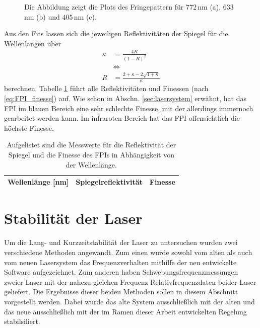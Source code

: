 \begin{figure}[hp]
	\caption[Finesse des FPIs]{Die Abbildung zeigt die Plots des
 	Fringepattern für $772\,$nm (a), $633\,$nm (b) und $405\,$nm (c).}
	\label{fig:finesse_messung}
 	\centering
 	\footnotesize
 	\fbox{\parbox{\dimexpr \linewidth - 2\fboxrule - 2\fboxsep}{
 	\subfloat[]{
		\label{subfig:finesse_messung_a}
		
		}\\
 	\subfloat[]{
		\label{subfig:finesse_messung_b}
		
		}\\
	 \subfloat[]{
		\label{subfig:finesse_messung_c}
		
		}
	}}
\end{figure}
Aus den Fits lassen sich die jeweiligen Reflektivitäten der Spiegel für die
Wellenlängen über
\begin{equation}\label{eq:finesse_messung_02}
	\begin{split}
		\kappa&=\frac{4R}{(1-R)^2}\\
		&\Leftrightarrow\\
		R&=\frac{2+\kappa-2\sqrt{1+\kappa}}{\kappa}
	\end{split}	
\end{equation}
berechnen. Tabelle \ref{tab:finesse} führt alle Reflektivitäten und Finessen
(nach \ref{eq:FPI_finesse}) auf. Wie schon in Abschn. \ref{sec:lasersystem}
erwähnt, hat das FPI im blauen Bereich eine sehr schlechte Finesse, mit der
allerdings immernoch gearbeitet werden kann. Im infraroten Bereich hat das FPI
offensichtlich die höchste Finesse.
\begin{table}[h]
	\begin{tabular}{ccc}
		\toprule
		\multicolumn{1}{C{0.30\textwidth}}{Wellenlänge [nm]} &
		\multicolumn{1}{C{0.31\textwidth}}{Spiegelreflektivität} &
		\multicolumn{1}{C{0.30\textwidth}}{Finesse}\\
		\midrule[1px]
		\hline
		
		\bottomrule[1px]
	\end{tabular}
	\caption[FPI Finesse]{Aufgelistet sind die Messwerte für die Reflektivität der
	Spiegel und die Finesse des FPIs in Abhängigkeit von der Wellenlänge.}
	\label{tab:finesse}
\end{table}

\section{Stabilität der Laser}\label{sec:stabilitaet_der_laser}
Um die Lang- und Kurzzeitstabilität der Laser zu untersuchen wurden zwei
verschiedene Methoden angewandt. Zum einen wurde sowohl vom alten als auch vom
neuen Lasersystem das Frequenzverhalten mithilfe der neu entwickelte Software
aufgezeichnet. Zum anderen haben Schwebungsfrequenzmessungen zweier Laser mit
der nahezu gleichen Frequenz Relativfrequenzdaten beider Laser geliefert. Die
Ergebnisse dieser beiden Methoden sollen in diesem Abschnitt vorgestellt werden.
Dabei wurde das alte System ausschließlich mit der alten und das neue
ausschließlich mit der im Ramen dieser Arbeit entwickelten Regelung
stabilsiliert.

